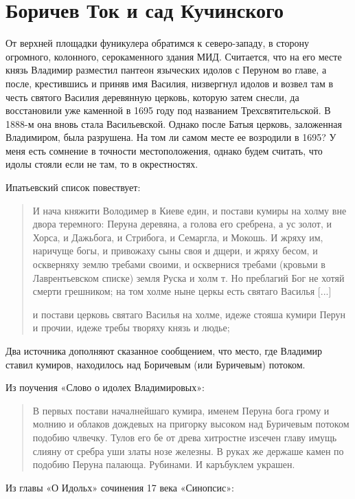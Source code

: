 \chapter {Боричев Ток и сад Кучинского}

От верхней площадки фуникулера обратимся к сев\-е\-ро-западу, в сторону огромного, колонного, серокаменного здания МИД. Считается, что на его месте князь Владимир разместил пантеон языческих идолов с Перуном во главе, а после, крестившись и приняв имя Василия, низвергнул идолов и возвел там в честь святого Василия деревянную церковь, которую затем снесли, да восстановили уже каменной в 1695 году под названием Трехсвятительской. В 1888-м она вновь стала Васильевской. Однако после Батыя церковь, заложенная Владимиром, была разрушена. На том ли самом месте ее возродили в 1695? У меня есть сомнение в точности местоположения, однако будем считать, что идолы стояли если не там, то в окрестностях.

Ипатьевский список повествует:

\begin{quotation}
И нача княжити Володимер в Киеве един, и постави кумиры на холму вне двора теремного: Перуна деревяна, а голова его сребрена, а ус золот, и Хорса, и Дажьбога, и Стрибога, и Семаргла, и Мокошь. И жряху им, наричуще богы, и привожаху сыны своя и дщери, и жряху бесом, и оскверняху землю требами своими, и осквернися требами (кровьми в Лаврентьевском списке) земля Руска и холм т. Но преблагий Бог не хотяй смерти грешником; на том холме ныне церкы есть святаго Василья [...]

и постави церковь святаго Василья на холме, идеже стояша кумири Перун и прочии, идеже требы творяху князь и людье;
\end{quotation}


Два источника дополняют сказанное сообщением, что место, где Владимир ставил кумиров, находилось над Боричевым (или Буричевым) потоком.

Из поучения «Слово о идолех Владимировых»: 

\begin{quotation}
В первых постави началнейшаго кумира, именем Перуна бога грому и молнию и облаков дождевых на пригорку высоком над Буричевым потоком подобию члвечку. Тулов его бе от древа хитростне изсечен главу имущь слияну от сребра уши златы нозе железны. В руках же держаше камен по подобию Перуна палающа. Рубинами. И каръбуклем украшен.
\end{quotation}

Из главы «О Идольх» сочинения 17 века «Синопсис»:

